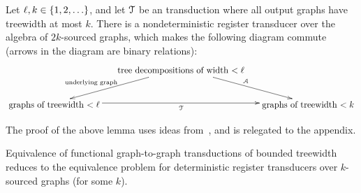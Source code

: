 

\begin{lemma}\label{lem:transduction-to-registers}
    Let $\ell, k \in \{1,2,\ldots\}$, and  let ${\mathcal T}$ be an \mso transduction where all output graphs have treewidth at most $k$. There is a nondeterministic register transducer over the algebra of $2k$-sourced graphs, which makes the following diagram commute (arrows in the diagram are binary relations):
    \begin{align*}
    \xymatrix@C=0.5cm{
         & \txt{tree decompositions of width $< \ell$}
        \ar[dl]_-{\txt{\scriptsize underlying graph \qquad \qquad}}
         \ar[dr]^\Aa\\
        \txt{graphs of treewidth $< \ell$}\ar[rr]_\Tt & &
        \txt{graphs  of treewidth $< k$} 
    }
    \end{align*}
\end{lemma}
The proof of the above lemma uses ideas from~\cite{courcelleMonadicSecondorderLogic1990,bloem_comparison_2000,alurStreamingTreeTransducers2017}, and  is relegated to the appendix.  

\begin{corollary}
Equivalence of functional graph-to-graph \mso transductions of bounded treewidth reduces to the equivalence problem for deterministic register transducers over $k$-sourced graphs (for some $k$). 
\end{corollary}

